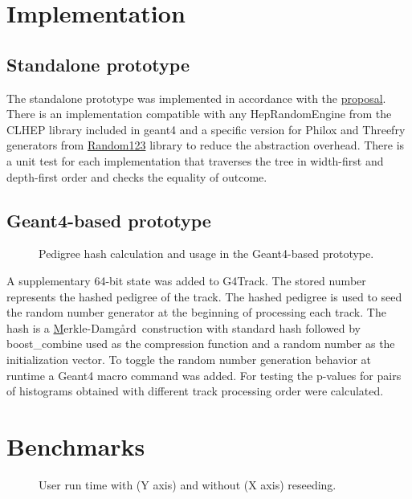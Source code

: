 \documentclass[a4paper, 12pt]{article} %
\newcommand{\MD}{Merkle-Damg\r{a}rd}
\begin{document}
 \section*{ Implementation }
 
  \subsection*{ Standalone prototype }
   The standalone prototype was implemented in accordance with the \href{https://sd57.github.io/g4dprng/gsoc-proposal-Savin.html}{proposal}.
   There is an implementation compatible with any HepRandomEngine from the CLHEP library included in geant4
   and a specific version for Philox and Threefry generators from
   \href{https://www.deshawresearch.com/resources_random123.html}{Random123} library
   to reduce the abstraction overhead.
   There is a unit test for each implementation that traverses the tree in width-first and depth-first order and checks the equality of outcome.

   \subsection*{ Geant4-based prototype }
   
  \begin{figure}
   \scalebox{.5}{}
   \label{MD}
   \caption{Pedigree hash calculation and usage in the Geant4-based prototype.}
  \end{figure}
  A supplementary 64-bit state was added to G4Track.
  The stored number represents the hashed pedigree of the track.
  The hashed pedigree is used to seed the random number generator at the beginning of processing each track.
  The hash is a \href{https://en.wikipedia.org/wiki/Merkle\%E2\%80\%93Damg\%C3\%A5rd\_construction}\MD\ construction with standard hash followed by boost\_combine used as the compression function and a random number as the initialization vector.
  To toggle the random number generation behavior at runtime a Geant4 macro command was added.
  For testing the p-values for pairs of histograms obtained with different track processing order were calculated.
  
 \section*{ Benchmarks }
  \begin{figure}
   \scalebox{.8}{}
   \label{USERTIME}
   \caption{User run time with (Y axis) and without (X axis) reseeding.}
  \end{figure}
  
\end{document}
